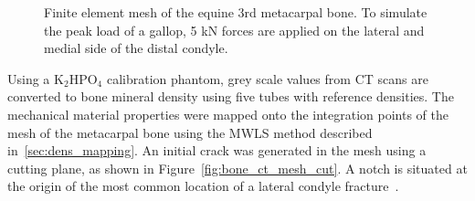 \documentclass[onecolumn]{svjour3}
\begin{document}
% 
% 
\begin{figure}[h]
	\begin{center}
		\caption{Finite element mesh of the equine 3rd metacarpal bone. To simulate the peak load of a gallop, 5 kN forces are applied on the lateral and medial side of the distal condyle.}
		\label{fig:mc3_BC}
	\end{center}
\end{figure}
% 
% 
Using a $\mathrm {K_2 HPO_4}$ calibration phantom, grey scale values from CT scans are converted to bone mineral density using five tubes with reference densities. 
The mechanical material properties were mapped onto the integration points of the mesh of the metacarpal bone using the MWLS method described in~\ref{sec:dens_mapping}. 
% 
An initial crack was generated in the mesh using a cutting plane, as shown in Figure~\ref{fig:bone_ct_mesh_cut}. A notch is situated at the origin of the most common location of a lateral condyle fracture~\cite{jacklin2012frequency}. 
\end{document}
